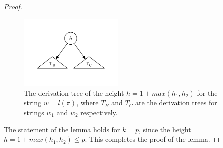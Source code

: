 \begin{proof}
	\begin{figure}[h!]
		\centering
		\includegraphics[width=5cm]{pictures/tree2.pdf}
		\caption{The derivation tree of the height $h = 1 + max(h_1, h_2)$ for the string $w = l(\pi)$, where $T_B$ and $T_C$ are the derivation trees for strings $w_1$ and $w_2$ respectively.}
		\label{tree2}
	\end{figure}
	
	The statement of the lemma holds for $k = p$, since the height $h = 1 + max(h_1, h_2) \leq p$. This completes the proof of the lemma.
\end{proof}